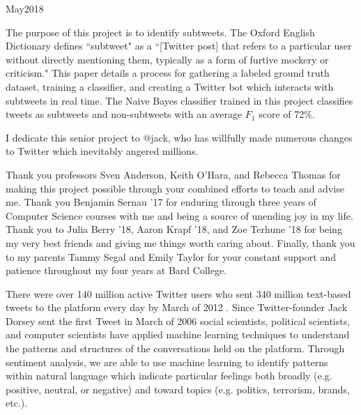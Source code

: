 \documentclass[11pt, twoside, reqno]{book}
\begin{document}
    {May}{2018}

\abstr

The purpose of this project is to identify subtweets. The Oxford English Dictionary defines ``subtweet" as a ``[Twitter post] that refers to a particular user without directly mentioning them, typically as a form of furtive mockery or criticism." This paper details a process for gathering a labeled ground truth dataset, training a classifier, and creating a Twitter bot which interacts with subtweets in real time. The Naive Bayes classifier trained in this project classifies tweets as subtweets and non-subtweets with an average $F_{1}$ score of 72\%. 

\tableofcontents
\listoffigures

\dedic

I dedicate this senior project to @jack, who has willfully made numerous changes to Twitter which inevitably angered millions.

\acknowl

Thank you professors Sven Anderson, Keith O'Hara, and Rebecca Thomas for making this project possible through your combined efforts to teach and advise me. Thank you Benjamin Sernau '17 for enduring through three years of Computer Science courses with me and being a source of unending joy in my life. Thank you to Julia Berry '18, Aaron Krapf '18, and Zoe Terhune '18 for being my very best friends and giving me things worth caring about. Finally, thank you to my parents Tammy Segal and Emily Taylor for your constant support and patience throughout my four years at Bard College. 

\startmain
\intro

There were over 140 million active Twitter users who sent 340 million text-based tweets to the platform every day by March of 2012 \cite{twitter_stats}. Since Twitter-founder Jack Dorsey sent the first Tweet in March of 2006 \cite{first_tweet} social scientists, political scientists, and computer scientists have applied machine learning techniques to understand the patterns and structures of the conversations held on the platform. Through sentiment analysis, we are able to use machine learning to identify patterns within natural language which indicate particular feelings both broadly (e.g. positive, neutral, or negative) and toward topics (e.g. politics, terrorism, brands, etc.).
\end{document}
